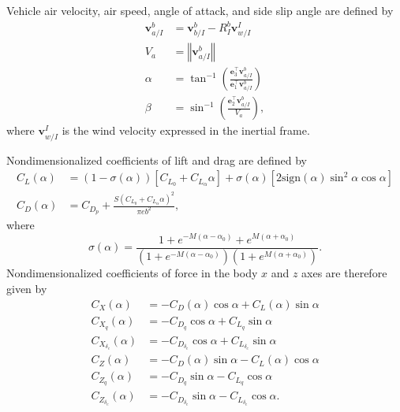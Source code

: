 \documentclass{article}
\newcommand{\norm}[1]{\left\Vert{#1}\right\Vert}
\begin{document}
\begin{appendices}
Vehicle air velocity, air speed, angle of attack, and side slip angle are defined by
\begin{align}
\mathbf{v}_{a/I}^{b} & =\mathbf{v}_{b/I}^{b}-R_{I}^{b}\mathbf{v}_{w/I}^{I}\\
V_{a} & =\norm{\mathbf{v}_{a/I}^{b}} \\
\alpha & =\tan^{-1}\left(\frac{\mathbf{e}_{3}^{\top}\mathbf{v}_{a/I}^{b}}{\mathbf{e}_{1}^{\top}\mathbf{v}_{a/I}^{b}}\right)\\
\beta & =\sin^{-1}\left(\frac{\mathbf{e}_{2}^{\top}\mathbf{v}_{a/I}^{b}}{V_{a}}\right),
\end{align}
where $\mathbf{v}_{w/I}^I$ is the wind velocity expressed in the inertial frame.

Nondimensionalized coefficients of lift and drag are defined by
\begin{align}
C_{L}\left(\alpha\right) & =\left(1-\sigma\left(\alpha\right)\right)\left[C_{L_{0}}+C_{L_{\alpha}}\alpha\right]+\sigma\left(\alpha\right)\left[2\mathrm{sign}\left(\alpha\right)\sin^{2}\alpha\cos\alpha\right]\nonumber\\
C_{D}\left(\alpha\right) & =C_{D_{p}}+\frac{S\left(C_{L_{0}}+C_{L_{\alpha}}\alpha\right)^{2}}{\pi eb^{2}},
\end{align}
where
\begin{equation}
\sigma\left(\alpha\right) =\frac{1+e^{-M\left(\alpha-\alpha_{0}\right)}+e^{M\left(\alpha+\alpha_{0}\right)}}{\left(1+e^{-M\left(\alpha-\alpha_{0}\right)}\right)\left(1+e^{M\left(\alpha+\alpha_{0}\right)}\right)}.
\end{equation}
Nondimensionalized coefficients of force in the body $x$ and $z$ axes are therefore given by
\begin{align}
C_{X}\left(\alpha\right) & =-C_{D}\left(\alpha\right)\cos\alpha+C_{L}\left(\alpha\right)\sin\alpha\\
C_{X_{q}}\left(\alpha\right) & =-C_{D_{q}}\cos\alpha+C_{L_{q}}\sin\alpha\\
C_{X_{\delta_{e}}}\left(\alpha\right) & =-C_{D_{\delta_{e}}}\cos\alpha+C_{L_{\delta_{e}}}\sin\alpha\\
C_{Z}\left(\alpha\right) & =-C_{D}\left(\alpha\right)\sin\alpha-C_{L}\left(\alpha\right)\cos\alpha\\
C_{Z_{q}}\left(\alpha\right) & =-C_{D_{q}}\sin\alpha-C_{L_{q}}\cos\alpha\\
C_{Z_{\delta_{e}}}\left(\alpha\right) & =-C_{D_{\delta_{e}}}\sin\alpha-C_{L_{\delta_{e}}}\cos\alpha.
\end{align}


\end{appendices}
\end{document}
